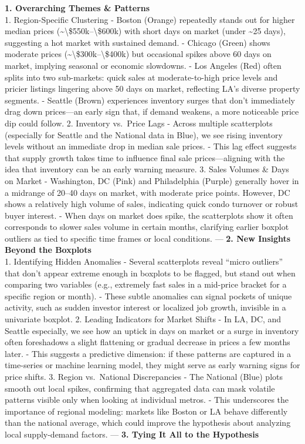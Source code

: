 \documentclass[11pt]{article}
\begin{document}
\textbf{1. Overarching Themes \& Patterns}\\
1. Region-Specific Clustering - Boston (Orange) repeatedly stands out
for higher median prices
(\textasciitilde\textbackslash\$550k--\textbackslash\$600k) with short
days on market (under \textasciitilde25 days), suggesting a hot market
with sustained demand. - Chicago (Green) shows moderate prices
(\textasciitilde\textbackslash\$300k--\textbackslash\$400k) but
occasional spikes above 60 days on market, implying seasonal or economic
slowdowns. - Los Angeles (Red) often splits into two sub-markets: quick
sales at moderate-to-high price levels and pricier listings lingering
above 50 days on market, reflecting LA's diverse property segments. -
Seattle (Brown) experiences inventory surges that don't immediately drag
down prices---an early sign that, if demand weakens, a more noticeable
price dip could follow. 2. Inventory vs.~Price Lags - Across multiple
scatterplots (especially for Seattle and the National data in Blue), we
see rising inventory levels without an immediate drop in median sale
prices. - This lag effect suggests that supply growth takes time to
influence final sale prices---aligning with the idea that inventory can
be an early warning measure. 3. Sales Volumes \& Days on Market -
Washington, DC (Pink) and Philadelphia (Purple) generally hover in a
midrange of 20--40 days on market, with moderate price points. However,
DC shows a relatively high volume of sales, indicating quick condo
turnover or robust buyer interest. - When days on market does spike, the
scatterplots show it often corresponds to slower sales volume in certain
months, clarifying earlier boxplot outliers as tied to specific time
frames or local conditions. --- \textbf{2. New Insights Beyond the
Boxplots}\\
1. Identifying Hidden Anomalies - Several scatterplots reveal ``micro
outliers'' that don't appear extreme enough in boxplots to be flagged,
but stand out when comparing two variables (e.g., extremely fast sales
in a mid-price bracket for a specific region or month). - These subtle
anomalies can signal pockets of unique activity, such as sudden investor
interest or localized job growth, invisible in a univariate boxplot. 2.
Leading Indicators for Market Shifts - In LA, DC, and Seattle
especially, we see how an uptick in days on market or a surge in
inventory often foreshadows a slight flattening or gradual decrease in
prices a few months later. - This suggests a predictive dimension: if
these patterns are captured in a time-series or machine learning model,
they might serve as early warning signs for price shifts. 3. Region
vs.~National Discrepancies - The National (Blue) plots smooth out local
spikes, confirming that aggregated data can mask volatile patterns
visible only when looking at individual metros. - This underscores the
importance of regional modeling: markets like Boston or LA behave
differently than the national average, which could improve the
hypothesis about analyzing local supply-demand factors. --- \textbf{3.
Tying It All to the Hypothesis}
\end{document}
